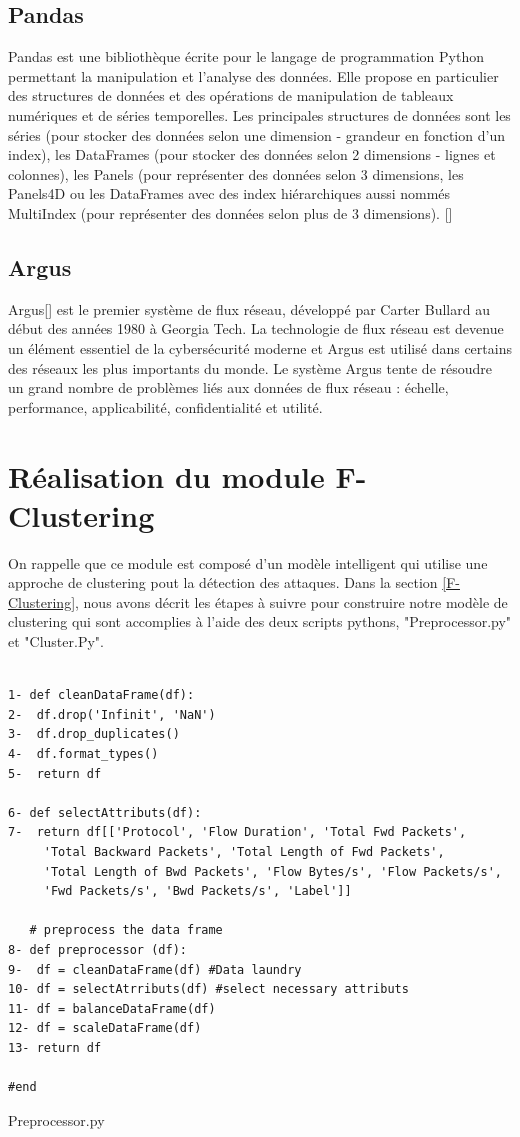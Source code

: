 \subsection{Pandas}
Pandas est une bibliothèque écrite pour le langage de programmation Python permettant la manipulation et l'analyse des données. Elle propose en particulier des structures de données et des opérations de manipulation de tableaux numériques et de séries temporelles. Les principales structures de données sont les séries (pour stocker des données selon une dimension - grandeur en fonction d'un index), les DataFrames (pour stocker des données selon 2 dimensions - lignes et colonnes), les Panels (pour représenter des données selon 3 dimensions, les Panels4D ou les DataFrames avec des index hiérarchiques aussi nommés MultiIndex (pour représenter des données selon plus de 3 dimensions). [\cite{30}]

\subsection{Argus}
Argus[\cite{31}] est le premier système de flux réseau, développé par Carter Bullard au début des années 1980 à Georgia Tech. La technologie de flux réseau est devenue un élément essentiel de la cybersécurité moderne et Argus est utilisé dans certains des réseaux les plus importants du monde. Le système Argus tente de résoudre un grand nombre de problèmes liés aux données de flux réseau : échelle, performance, applicabilité, confidentialité et utilité.\\

\section{Réalisation du module F-Clustering}
On rappelle que ce module est composé d'un modèle intelligent qui utilise une approche de clustering pout la détection des attaques. Dans la section \ref{F-Clustering}, nous avons décrit les étapes à suivre pour construire notre modèle de clustering qui sont accomplies à l'aide des deux scripts pythons, "Preprocessor.py" et "Cluster.Py".
\begin{algorithm}[H]
\begin{verbatim}

1- def cleanDataFrame(df):
2-  df.drop('Infinit', 'NaN')
3-  df.drop_duplicates()
4-  df.format_types()
5-  return df

6- def selectAttributs(df):
7-  return df[['Protocol', 'Flow Duration', 'Total Fwd Packets',
     'Total Backward Packets', 'Total Length of Fwd Packets',	
     'Total Length of Bwd Packets', 'Flow Bytes/s', 'Flow Packets/s', 
     'Fwd Packets/s', 'Bwd Packets/s', 'Label']]
	
   # preprocess the data frame
8- def preprocessor (df): 
9-  df = cleanDataFrame(df) #Data laundry
10- df = selectAtrributs(df) #select necessary attributs 
11- df = balanceDataFrame(df) 
12- df = scaleDataFrame(df)
13- return df

#end
\end{verbatim}
\caption{Preprocessor.py}
\end{algorithm}

